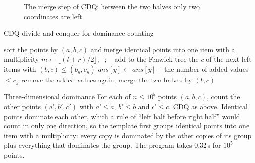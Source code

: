 \begin{figure}[htbp]
\centering
{}
\caption{The merge step of CDQ: between the two halves only two coordinates are left.}
\label{fig:cdq}
\end{figure}

\begin{pseudo}{CDQ divide and conquer for dominance counting}
\begin{algorithmic}[1]
\State sort the points by $(a, b, c)$ and merge identical points into one item with a multiplicity
 
   \State \Return \EndIf
  \State $m \gets \lfloor (l + r) / 2 \rfloor$; \ ; \ 
    \State add to the Fenwick tree the $c$ of the next left items with $(b, c) \le (b_y, c_y)$
    \State $\mathit{ans}[y] \gets \mathit{ans}[y] + {}$the number of added values $\le c_y$
  \EndFor
  \State remove the added values again; merge the two halves by $(b, c)$
\EndProcedure
\end{algorithmic}
\end{pseudo}

\begin{problem}{Three-dimensional dominance}
For each of $n \le 10^5$ points $(a, b, c)$, count the other points $(a', b', c')$ with $a' \le a$, $b' \le b$ and $c' \le c$.
\solution CDQ as above. Identical points dominate each other, which a rule of ``left half before right half'' would count in only
one direction, so the template first groups identical points into one item with a multiplicity: every copy is dominated by the other
copies of its group plus everything that dominates the group. The program takes 0.32\,s for $10^5$ points.
\end{problem}

